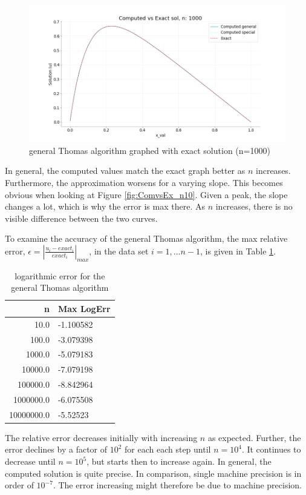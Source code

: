 \documentclass[%
oneside,                 %
final,                   %
10pt]{article}
\begin{document}
\begin{figure}[H]
\begin{center}
\graphicspath{ {ComputedvsExact/} }
\includegraphics[width=13cm]{ComputedvsExact_sol_n1000.png}
\caption{general Thomas algorithm graphed with exact solution (n=1000)}
\end{center}
\end{figure}
In general, the computed values match the exact graph better as $n$ increases. Furthermore, the approximation worsens for a varying slope. This becomes obvious when looking at Figure \ref{fig:ComvsEx_n10}. 
Given a peak, the slope changes a lot, which is why the error is max there. 
As $n$ increases, there is no visible difference between the two curves. 

To examine the accuracy of the general Thomas algorithm, the max relative error, $  \epsilon =  \left\lvert \frac{u_i-exact_i}{exact_i} \right\rvert_{max}$, in the data set $i=1,...n-1$, is given in Table \ref{LogError}. 
\begin{table}[H]
\caption{logarithmic error for the general Thomas algorithm}
\centering

\begin{tabular}{rl}
\toprule
     n &              Max LogErr \\
\midrule
    10.0 & -1.100582\\
   100.0 &  -3.079398\\
   1000.0 & -5.079183\\
  10000.0 &  -7.079198\\
  100000.0 &  -8.842964 \\
 1000000.0 &  -6.075508 \\
 10000000.0 &  -5.52523 \\
\bottomrule
\end{tabular}
\label{LogError}
\end{table}
The relative error decreases initially with increasing $n$ as expected. Further, the error declines by a factor of $10^2$ for each each step until $n=10^4$. It continues to decrease until $n=10^5$, but starts then to increase again. In general, the computed solution is quite precise. In comparison, single machine precision is in order of $10^{-7}$. The error increasing might therefore be due to machine precision.
\end{document}
